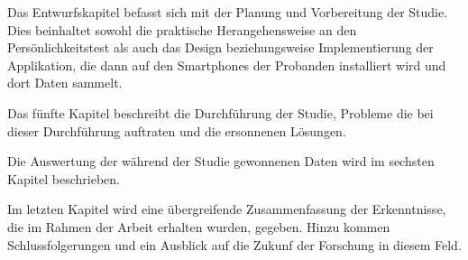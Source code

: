 Das Entwurfskapitel befasst sich mit der Planung und Vorbereitung der Studie.
Dies beinhaltet sowohl die praktische Herangehensweise an den Persönlichkeitstest als auch das Design beziehungsweise Implementierung der Applikation,
die dann auf den Smartphones der Probanden installiert wird und dort Daten sammelt. 

Das fünfte Kapitel beschreibt die Durchführung der Studie, Probleme die bei dieser Durchführung auftraten und die ersonnenen Lösungen.

Die Auswertung der während der Studie gewonnenen Daten wird im sechsten Kapitel beschrieben.

Im letzten Kapitel wird eine übergreifende Zusammenfassung der Erkenntnisse, die im Rahmen der Arbeit erhalten wurden, gegeben.
Hinzu kommen Schlussfolgerungen und ein Ausblick auf die Zukunf der Forschung in diesem Feld.


